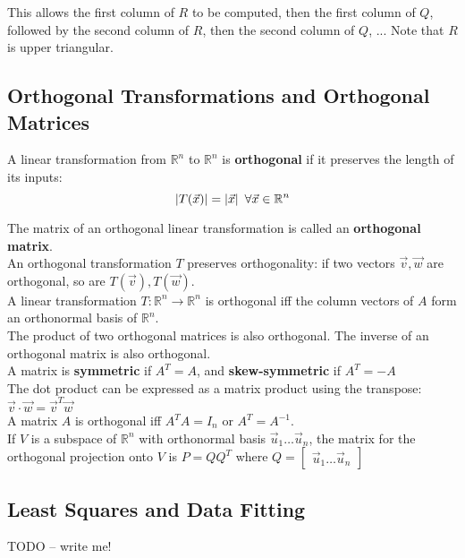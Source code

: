 \documentclass[]{scrartcl}
\begin{document}
	This allows the first column of $R$ to be computed, then the first column of $Q$, followed by the second column of $R$, then the second column of $Q$, ... Note that $R$ is upper triangular.
	
	\subsection{Orthogonal Transformations and Orthogonal Matrices}
	A linear transformation from $\mathbb{R}^n$ to $\mathbb{R}^n$ is \textbf{orthogonal} if it preserves the length of its inputs:
	$$
	\lvert T(\vec{x}) \rvert = \lvert \vec{x} \rvert \enskip \forall \vec{x} \in \mathbb{R}^n
	$$
	
	The matrix of an orthogonal linear transformation is called an \textbf{orthogonal matrix}.\\
	
	An orthogonal transformation $T$ preserves orthogonality: if two vectors $\vec{v}, \vec{w}$ are orthogonal, so are $T(\vec{v}), T(\vec{w})$.\\
	
	A linear transformation $T: \mathbb{R}^n \rightarrow \mathbb{R}^n$ is orthogonal iff the column vectors of $A$ form an orthonormal basis of $\mathbb{R}^n$.\\
	
	The product of two orthogonal matrices is also orthogonal. The inverse of an orthogonal matrix is also orthogonal.\\
	
	A matrix is \textbf{symmetric} if $A^T = A$, and \textbf{skew-symmetric} if $A^T = -A$\\
	
	The dot product can be expressed as a matrix product using the transpose: $\vec{v} \cdot \vec{w} = \vec{v}^T \vec{w}$\\
	
	A matrix $A$ is orthogonal iff $ A^T A = I_n$ or $A^T = A^{-1} $.\\
	
	If $V$ is a subspace of $\mathbb{R}^n$ with orthonormal basis $\vec{u}_1 \ldots \vec{u}_n$, the matrix for the orthogonal projection onto $V$ is $P = Q Q^T$ where $Q = \begin{bmatrix}
	\vec{u}_1 \ldots \vec{u}_n
	\end{bmatrix}$
	
	\subsection{Least Squares and Data Fitting}
	TODO -- write me!
	
\end{document}

